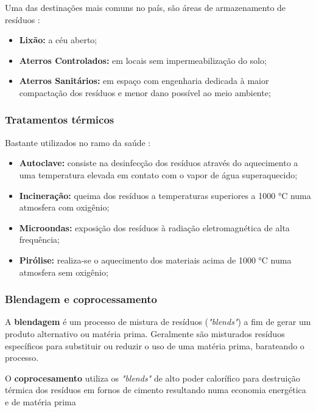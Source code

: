 Uma das destinações mais comuns no país, são áreas de armazenamento de resíduos \cite{diagnostico_cristine}:
\begin{itemize} 
	\item \textbf{Lixão:} a céu aberto;
	\item \textbf{Aterros Controlados:} em locais sem impermeabilização do solo;
	\item \textbf{Aterros Sanitários:} em espaço com engenharia dedicada à maior compactação dos resíduos e menor dano possível ao meio ambiente;
\end{itemize}
\subsubsection{Tratamentos térmicos}
Bastante utilizados no ramo da saúde \cite{diagnostico_cristine}:
\begin{itemize} 
	\item \textbf{Autoclave:} consiste na desinfecção dos resíduos através do aquecimento a uma temperatura elevada em contato com o vapor de água superaquecido;
	\item \textbf{Incineração:} queima dos resíduos a temperaturas superiores a 1000 °C numa atmosfera com oxigênio;
	\item \textbf{Microondas:} exposição dos resíduos à radiação eletromagnética de alta frequência;
	\item \textbf{Pirólise:} realiza-se o aquecimento dos materiais acima de 1000 °C numa atmosfera sem oxigênio;
\end{itemize}

\subsubsection{Blendagem e coprocessamento}

A \textbf{blendagem} é um processo de mistura de resíduos (\textit{"blends"}) a fim de gerar um produto alternativo ou matéria prima. Geralmente são misturados resíduos específicos para substituir ou reduzir o uso de uma matéria prima, barateando o processo. 

O \textbf{coprocesamento} utiliza os \textit{"blends"} de alto poder calorífico para destruição térmica dos resíduos em fornos de cimento resultando numa economia energética e de matéria prima \cite{noauthor_destinacao_nodate}


